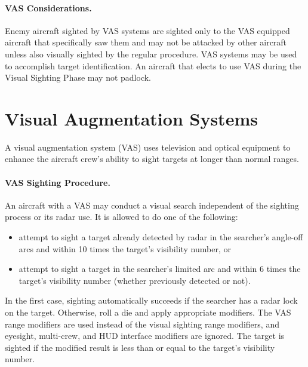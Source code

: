 \begin{advancedrules}
{\paragraph{VAS Considerations.} Enemy aircraft sighted by VAS systems are sighted only to the VAS equipped aircraft that specifically saw them and may not be attacked by other aircraft unless also visually sighted by the regular procedure. VAS systems may be used to accomplish target identification. An aircraft that elects to use VAS during the Visual Sighting Phase may not padlock.

}{

\section{Visual Augmentation Systems}
\label{rule:vas}

A visual augmentation system (VAS) uses television and optical equipment to enhance the aircraft crew’s ability to sight targets at longer than normal ranges.


\paragraph{VAS Sighting Procedure.} An aircraft with a VAS may conduct a visual search independent of the sighting process or its radar use. It is allowed to do one of the following:

\begin{itemize}

    \item attempt to sight a target already detected by radar in the searcher’s  angle-off arcs and within 10 times the target’s visibility number, or

    \item attempt to sight a target in the searcher’s limited arc and within 6 times the target’s visibility number (whether previously detected or not).

\end{itemize}

In the first case, sighting automatically succeeds if the searcher has a radar lock on the target. Otherwise, roll a die and apply appropriate modifiers. The VAS range modifiers are used instead of the visual sighting range modifiers, and eyesight, multi-crew, and HUD interface modifiers are ignored. The target is sighted if the modified result is less than or equal to the target’s visibility number.

}
\end{advancedrules}
